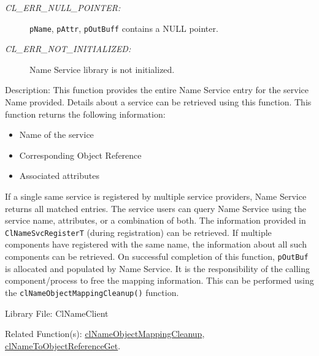 \begin{flushleft}
\begin{Desc}
\begin{description}
\item[{\em CL\_\-ERR\_\-NULL\_\-POINTER:}]{\tt{pName}}, {\tt{pAttr}}, {\tt{pOutBuff}} contains a NULL pointer.
\item[{\em CL\_\-ERR\_\-NOT\_\-INITIALIZED:}]Name Service library is not initialized.\end{description}
\end{Desc}
\begin{Desc}
\item[Description:]This function provides the entire Name Service entry for the service Name provided.
Details about a service can be retrieved using this function. This function returns the following information:
\begin{itemize}
\item
Name of the service
\item
Corresponding Object Reference
\item
Associated attributes
\end{itemize}
If a single same service is registered by multiple service providers, Name Service returns all matched entries. The service users can query Name Service 
using the service name, attributes, or a combination of both. The information provided in {\tt{ClNameSvcRegisterT}} (during registration) can be retrieved. If 
multiple components have registered with the same name, the information about all such components can be retrieved. 
On successful completion of this function, {\tt{pOutBuf}} is allocated and populated by Name Service. It is the responsibility of the calling component/process to 
free the mapping information. This can be performed using the {\tt{clNameObjectMappingCleanup()}} function.
\end{Desc}
\begin{Desc}
\item[Library File:]Cl\-Name\-Client\end{Desc}
\begin{Desc}
\item[Related Function(s):]\hyperlink{pagens110}{cl\-Name\-Object\-Mapping\-Cleanup}, 
\hyperlink{pagens108}{cl\-Name\-To\-Object\-Reference\-Get}. \end{Desc}
\newpage



\end{flushleft}
